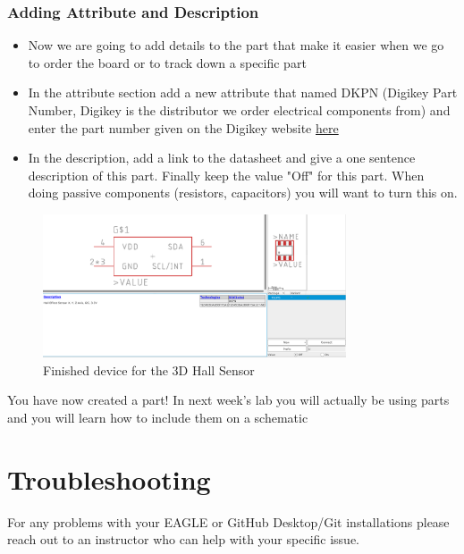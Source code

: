 \documentclass{article}
\begin{document}
\subsubsection{Adding Attribute and Description}
\begin{itemize}
    \item Now we are going to add details to the part that make it easier when we go to order the board or to track down a specific part
    \item In the attribute section add a new attribute that named DKPN (Digikey Part Number, Digikey is the distributor we order electrical components from) and enter the part number given on the Digikey website \href{https://www.digikey.com/product-detail/en/infineon-technologies/TLE493DA2B6HTSA1/TLE493DA2B6HTSA1CT-ND/9808573}{here}
    \item In the description, add a link to the datasheet and give a one sentence description of this part. Finally keep the value "Off" for this part. When doing passive components (resistors, capacitors) you will want to turn this on.
\end{itemize}
\begin{figure}[H]
    \center
	\includegraphics[width=0.8\textwidth, keepaspectratio]{images/device.png}
	\caption{Finished device for the 3D Hall Sensor}
	\label{fig:device}
\end{figure}

You have now created a part! In next week's lab you will actually be using parts and you will learn how to include them on a schematic



\section{Troubleshooting}
For any problems with your EAGLE or GitHub Desktop/Git installations please reach out to an instructor who can help with your specific issue.
\end{document}
